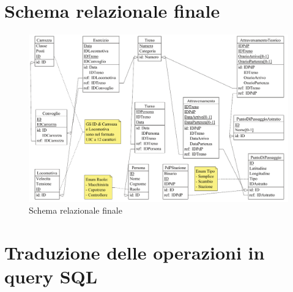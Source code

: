 \documentclass[a4paper,12pt]{report}
\begin{document}
	\section{Schema relazionale finale}
	\begin{figure}[H]
		\begin{center}
			\includegraphics[width=\linewidth]{res/schema/logico}
		\end{center}
		\caption{Schema relazionale finale}
	\end{figure}
	\section{Traduzione delle operazioni in query SQL}
\end{document}

